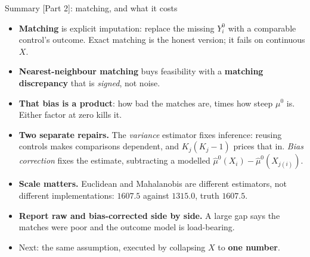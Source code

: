 \documentclass[
  11pt,
  ignorenonframetext,
  aspectratio=169,
]{beamer}
\providecommand{\tightlist}{%
  \setlength{\itemsep}{0pt}\setlength{\parskip}{0pt}}
\begin{document}
\begin{frame}{Summary {[}Part 2{]}: matching, and what it costs}
\protect{}\label{summary-part-2-matching-and-what-it-costs}
\begin{itemize}
\tightlist
\item
  \textbf{Matching} is explicit imputation: replace the missing
  \(Y^0_i\) with a comparable control's outcome. Exact matching is the
  honest version; it fails on continuous \(X\).
\item
  \textbf{Nearest-neighbour matching} buys feasibility with a
  \textbf{matching discrepancy} that is \emph{signed}, not noise.
\item
  \textbf{That bias is a product}: how bad the matches are, times how
  steep \(\mu^0\) is. Either factor at zero kills it.
\item
  \textbf{Two separate repairs.} The \emph{variance} estimator fixes
  inference: reusing controls makes comparisons dependent, and
  \(K_j(K_j-1)\) prices that in. \emph{Bias correction} fixes the
  estimate, subtracting a modelled
  \(\hat\mu^0(X_i) - \hat\mu^0(X_{j(i)})\).
\item
  \textbf{Scale matters.} Euclidean and Mahalanobis are different
  estimators, not different implementations: \(1607.5\) against
  \(1315.0\), truth \(1607.5\).
\item
  \textbf{Report raw and bias-corrected side by side.} A large gap says
  the matches were poor and the outcome model is load-bearing.
\item
  Next: the same assumption, executed by collapsing \(X\) to \textbf{one
  number}.
\end{itemize}
\end{frame}
\end{document}

